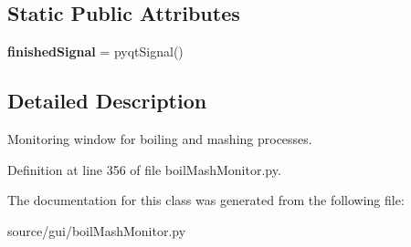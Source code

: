 \subsection*{Static Public Attributes}
\begin{DoxyCompactItemize}
\item 
\mbox{\label{classboil_mash_monitor_1_1_monitor_window_ad599c581853cf28248190090af20bb03}} 
{\bfseries finished\+Signal} = pyqt\+Signal()
\end{DoxyCompactItemize}


\subsection{Detailed Description}
Monitoring window for boiling and mashing processes. 

Definition at line 356 of file boil\+Mash\+Monitor.\+py.



The documentation for this class was generated from the following file\+:\begin{DoxyCompactItemize}
\item 
source/gui/boil\+Mash\+Monitor.\+py\end{DoxyCompactItemize}
